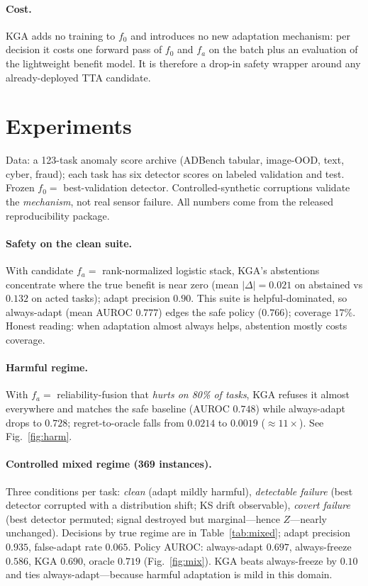 \documentclass[conference]{IEEEtran}
\theoremstyle{plain}
\theoremstyle{definition}
\begin{document}
\paragraph{Cost.} \textsc{KGA} adds no training to $f_0$ and introduces no new adaptation
mechanism: per decision it costs one forward pass of $f_0$ and $f_a$ on the batch plus an
evaluation of the lightweight benefit model. It is therefore a drop-in safety wrapper around
any already-deployed TTA candidate.

\section{Experiments}\label{sec:exp}
Data: a 123-task anomaly score archive (ADBench tabular, image-OOD, text, cyber,
fraud); each task has six detector scores on labeled validation and test. Frozen
$f_0=$ best-validation detector. Controlled-synthetic corruptions validate the
\emph{mechanism}, not real sensor failure. All numbers come from
the released reproducibility package.

\paragraph{Safety on the clean suite.} With candidate $f_a=$ rank-normalized logistic
stack, \textsc{KGA}'s abstentions concentrate where the true benefit is near zero
(mean $|\Delta|=0.021$ on abstained vs $0.132$ on acted tasks); adapt precision $0.90$.
This suite is helpful-dominated, so always-adapt (mean AUROC $0.777$) edges the safe
policy ($0.766$); coverage $17\%$. Honest reading: when adaptation almost always helps,
abstention mostly costs coverage.

\paragraph{Harmful regime.} With $f_a=$ reliability-fusion that \emph{hurts on 80\% of
tasks}, \textsc{KGA} refuses it almost everywhere and matches the safe baseline
(AUROC $0.748$) while always-adapt drops to $0.728$; regret-to-oracle falls from
$0.0214$ to $0.0019$ ($\approx11\times$). See Fig.~\ref{fig:harm}.

\paragraph{Controlled mixed regime (369 instances).} Three conditions per task:
\emph{clean} (adapt mildly harmful), \emph{detectable failure} (best detector
corrupted with a distribution shift; KS drift observable), \emph{covert failure} (best
detector permuted; signal destroyed but marginal---hence $Z$---nearly unchanged).
Decisions by true regime are in Table~\ref{tab:mixed}; adapt precision $0.935$,
false-adapt rate $0.065$. Policy AUROC: always-adapt $0.697$, always-freeze $0.586$,
\textsc{KGA} $0.690$, oracle $0.719$ (Fig.~\ref{fig:mix}). \textsc{KGA} beats
always-freeze by $0.10$ and ties always-adapt---because harmful adaptation is mild in
this domain.
\end{document}
